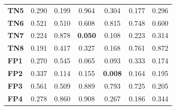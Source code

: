 \begin{table}
\begin{tabular}{lccc|ccc}
        \textbf{TN5}  & 0.290                                   & 0.199                                             & 0.964                                  & 0.304                                    & 0.177                                  & 0.296                                  \\
        \textbf{TN6}  & 0.521                                   & 0.510                                             & 0.608                                  & 0.815                                    & 0.748                                  & 0.600                                  \\
        \textbf{TN7}  & 0.224                                   & 0.878                                             & \cellcolor[HTML]{EFEFEF}\textbf{0.050} & 0.108                                    & 0.223                                  & 0.314                                  \\
        \textbf{TN8}  & 0.191                                   & 0.417                                             & 0.327                                  & 0.168                                    & 0.761                                  & 0.872                                  \\
        \textbf{FP1}  & 0.270                                   & 0.545                                             & 0.065                                  & 0.093                                    & 0.333                                  & 0.174                                  \\
        \textbf{FP2}  & 0.337                                   & 0.114                                             & 0.155                                  & \cellcolor[HTML]{EFEFEF}\textbf{0.008}   & 0.164                                  & 0.195                                  \\
        \textbf{FP3}  & 0.561                                   & 0.509                                             & 0.889                                  & 0.793                                    & 0.725                                  & 0.205                                  \\
        \textbf{FP4}  & 0.278                                   & 0.860                                             & 0.908                                  & 0.267                                    & 0.186                                  & 0.344                                  \\

\end{tabular}
\end{table}
